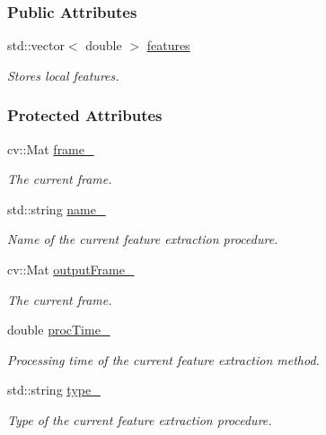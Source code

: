 \subsubsection*{Public Attributes}
\begin{DoxyCompactItemize}
\item 
std\-::vector$<$ double $>$ \hyperlink{group___feature_extractor_a8197cec0d029bac380885167df9f65e5}{features}
\begin{DoxyCompactList}\small\item\em Stores local features. \end{DoxyCompactList}\end{DoxyCompactItemize}
\subsubsection*{Protected Attributes}
\begin{DoxyCompactItemize}
\item 
cv\-::\-Mat \hyperlink{group___feature_extractor_a585b0dc6e6184422c5563e80bff50ffa}{frame\-\_\-}
\begin{DoxyCompactList}\small\item\em The current frame. \end{DoxyCompactList}\item 
std\-::string \hyperlink{group___feature_extractor_a0e73ef0aed82c04f06b6eeb9a9b9be8b}{name\-\_\-}
\begin{DoxyCompactList}\small\item\em Name of the current feature extraction procedure. \end{DoxyCompactList}\item 
cv\-::\-Mat \hyperlink{group___feature_extractor_a1c7b8087feb05f02b09eb1b536d443e6}{output\-Frame\-\_\-}
\begin{DoxyCompactList}\small\item\em The current frame. \end{DoxyCompactList}\item 
double \hyperlink{group___feature_extractor_a79d60ce90ab8e6ccd66ff8f7da2365c7}{proc\-Time\-\_\-}
\begin{DoxyCompactList}\small\item\em Processing time of the current feature extraction method. \end{DoxyCompactList}\item 
std\-::string \hyperlink{group___feature_extractor_aaf3aef30088cd1be80e1770d0a9d945b}{type\-\_\-}
\begin{DoxyCompactList}\small\item\em Type of the current feature extraction procedure. \end{DoxyCompactList}\end{DoxyCompactItemize}
